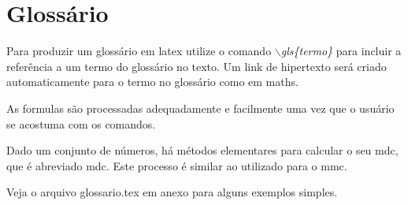 \section{Glossário}
\label{sec:glossario}
Para produzir um glossário em \Gls{latex} utilize o comando \emph{$\backslash$gls\{termo\}} para incluir a referência a um termo do glossário no texto. Um link de hipertexto será criado automaticamente para o termo no glossário como em \gls{maths}.

As \glspl{formula} são processadas adequadamente e facilmente uma vez que o usuário se acostuma com os comandos.

Dado um conjunto de números, há métodos elementares para calcular o seu \acrlong{mdc}, que é abreviado \acrshort{mdc}. Este processo é similar ao utilizado para o  \acrfull{mmc}.

Veja o arquivo glossario.tex em anexo para alguns exemplos simples.

